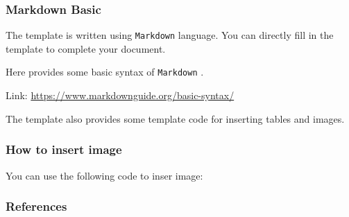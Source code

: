 \documentclass{beamer}
\begin{document}
\begin{frame}
\frametitle{Markdown Basic}

The template is written using \texttt{Markdown} language. You can directly fill in the template to complete your document.

Here provides some basic syntax of \texttt{Markdown} \cite{noauthor_basic_nodate}.

Link: \url{https://www.markdownguide.org/basic-syntax/}

The template also provides some template code for inserting tables and images.

\end{frame}

\begin{frame}
\frametitle{How to insert image}

You can use the following code to inser image:



\end{frame}



\begin{frame}
	\frametitle{References}
	\printbibliography
\end{frame}
\end{document}

